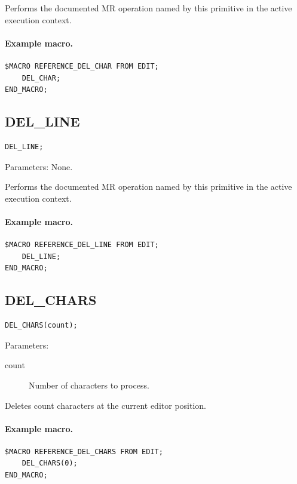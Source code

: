 \documentclass[a4paper,10pt,twoside,openany]{book}
\begin{document}
Performs the documented MR operation named by this primitive in the active execution context.

\paragraph{Example macro.}
\begin{verbatim}
$MACRO REFERENCE_DEL_CHAR FROM EDIT;
    DEL_CHAR;
END_MACRO;
\end{verbatim}

\label{prim:procedure-del-line}
\subsection*{DEL\_LINE}
\begin{verbatim}
DEL_LINE;
\end{verbatim}
Parameters: None.

Performs the documented MR operation named by this primitive in the active execution context.

\paragraph{Example macro.}
\begin{verbatim}
$MACRO REFERENCE_DEL_LINE FROM EDIT;
    DEL_LINE;
END_MACRO;
\end{verbatim}

\label{prim:procedure-del-chars}
\subsection*{DEL\_CHARS}
\begin{verbatim}
DEL_CHARS(count);
\end{verbatim}
Parameters:
\begin{description}
\item[count] Number of characters to process.
\end{description}

Deletes count characters at the current editor position.

\paragraph{Example macro.}
\begin{verbatim}
$MACRO REFERENCE_DEL_CHARS FROM EDIT;
    DEL_CHARS(0);
END_MACRO;
\end{verbatim}
\end{document}
